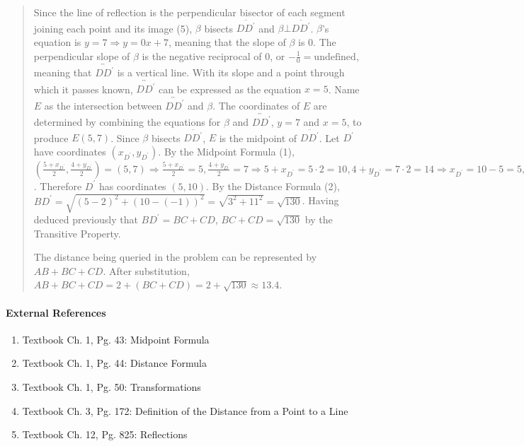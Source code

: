 \documentclass[letterpaper,12pt,twoside]{report}
\begin{document}
\begin{quotation}
		Since the line of reflection is the perpendicular bisector of each segment joining each point and its image (5), $\beta$ bisects $\overline{DD^\prime}$ and $\beta\bot\overline{DD^\prime}$. $\beta$'s equation is $y=7\Rightarrow y=0x+7$, meaning that the slope of $\beta$ is 0. The perpendicular slope of $\beta$ is the negative reciprocal of 0, or $-\frac{1}{0}=\text{undefined}$, meaning that $\overleftrightarrow{DD^\prime}$ is a vertical line. With its slope and a point through which it passes known, $\overleftrightarrow{DD^\prime}$ can be expressed as the equation $x=5$. Name $E$ as the intersection between $\overleftrightarrow{DD^\prime}$ and $\beta$. The coordinates of $E$ are determined by combining the equations for $\beta$ and $\overleftrightarrow{DD^\prime}$, $y=7$ and $x=5$, to produce $E(5,7)$. Since $\beta$ bisects $\overline{DD^\prime}$, $E$ is the midpoint of $\overline{DD^\prime}$. Let $D^\prime$ have coordinates $(x_{D^\prime}, y_{D^\prime})$. By the Midpoint Formula (1), $(\frac{5+x_{D^\prime}}{2},\frac{4+y_{D^\prime}}{2})=(5,7) \Rightarrow \frac{5+x_{D^\prime}}{2} = 5, \frac{4+y_{D^\prime}}{2}=7 \Rightarrow 5+x_{D^\prime}=5\cdot2=10, 4+y_{D^\prime}=7\cdot2=14 \Rightarrow x_{D^\prime}=10-5=5, y_{D^\prime}=14-4=10$. Therefore $D^\prime$ has coordinates $(5,10)$. By the Distance Formula (2), $BD^\prime=\sqrt{(5-2)^2+(10-(-1))^2}=\sqrt{3^2+11^2}=\sqrt{130}$. Having deduced previously that $BD^\prime=BC+CD$, $BC+CD=\sqrt{130}$ by the Transitive Property.
		
		The distance being queried in the problem can be represented by $AB+BC+CD$. After substitution, $AB+BC+CD=2+(BC+CD)=\boxed{2+\sqrt{130}\approx 13.4}$.
				
	\end{quotation}
	
	\paragraph{External References}
	
	\begin{enumerate}
		\item Textbook Ch. 1, Pg. 43: Midpoint Formula
		\item Textbook Ch. 1, Pg. 44: Distance Formula
		\item Textbook Ch. 1, Pg. 50: Transformations
		\item Textbook Ch. 3, Pg. 172: Definition of the Distance from a Point to a Line
		\item Textbook Ch. 12, Pg. 825: Reflections
	\end{enumerate}
	
\end{document}
